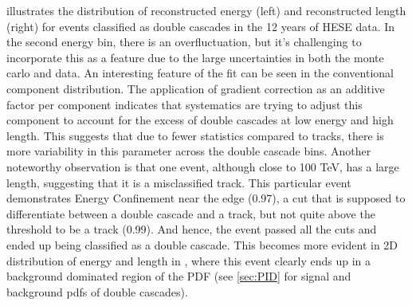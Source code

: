  illustrates the distribution of reconstructed energy (left) and reconstructed length (right) for events classified as double cascades in the 12 years of HESE data. In the second energy bin, there is an overfluctuation, but it's challenging to incorporate this as a feature due to the large uncertainties in both the monte carlo and data. An interesting feature of the fit can be seen in the conventional component distribution. The application of gradient correction as an additive factor per component indicates that systematics are trying to adjust this component to account for the excess of double cascades at low energy and high length. This suggests that due to fewer statistics compared to tracks, there is more variability in this parameter across the double cascade bins.  Another noteworthy observation is that one event, although close to 100 TeV, has a large length, suggesting that it is a misclassified track. This particular event demonstrates Energy Confinement near the edge (0.97), a cut that is supposed to differentiate between a double cascade and a track, but not quite above the threshold to be a track (0.99). And hence, the event passed all the cuts and ended up being classified as a double cascade. This becomes more evident in 2D distribution of energy and length in , where this event clearly ends up in a  background dominated region of the PDF (see \ref{sec:PID} for signal and background pdfs of double cascades). 


